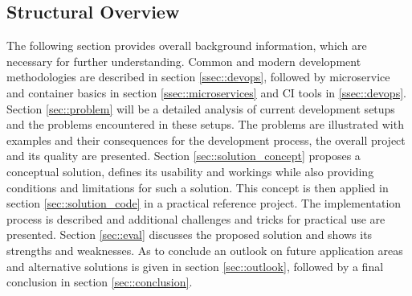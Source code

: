     \subsection{Structural Overview}
    The following section provides overall background information, which are necessary for further understanding. Common and modern development methodologies are described in section \ref{ssec::devops}, followed by microservice and container basics in section \ref{ssec::microservices} and \acl{CI} tools in \ref{ssec::devops}. Section \ref{sec::problem} will be a detailed analysis of current development setups and the problems encountered in these setups. The problems are illustrated with examples and their consequences for the development process, the overall project and its quality are presented. Section \ref{sec::solution_concept} proposes a conceptual solution, defines its usability and workings while also providing conditions and limitations for such a solution. This concept is then applied in section \ref{sec::solution_code} in a practical reference project. The implementation process is described and additional challenges and tricks for practical use are presented. Section \ref{sec::eval} discusses the proposed solution and shows its strengths and weaknesses. As to conclude an outlook on future application areas and alternative solutions is given in section \ref{sec::outlook}, followed by a final conclusion in section \ref{sec::conclusion}.
